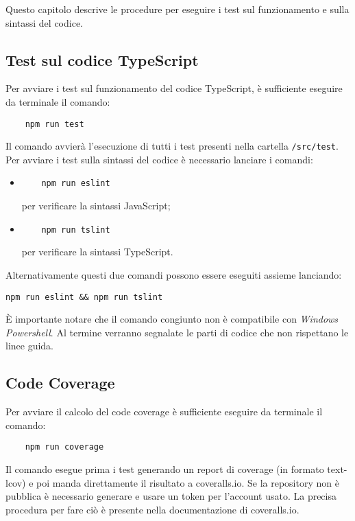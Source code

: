Questo capitolo descrive le procedure per eseguire i test sul funzionamento e sulla sintassi del codice.
\subsection{Test sul codice TypeScript}
Per avviare i test sul funzionamento del codice TypeScript, è sufficiente eseguire da terminale il comando:
\begin{verbatim}
	npm run test
\end{verbatim}
Il comando avvierà l'esecuzione di tutti i test presenti nella cartella \texttt{/src/test}.
Per avviare i test sulla sintassi del codice è necessario lanciare i comandi:
\begin{itemize}
	\item \begin{verbatim}
	npm run eslint
	\end{verbatim} per verificare la sintassi JavaScript;
	\item \begin{verbatim}
	npm run tslint
	\end{verbatim}
	per verificare la sintassi TypeScript.
\end{itemize}
Alternativamente questi due comandi possono essere eseguiti assieme lanciando:
\begin{verbatim}
npm run eslint && npm run tslint
\end{verbatim}
È importante notare che il comando congiunto non è compatibile con \emph{Windows Powershell}.
Al termine verranno segnalate le parti di codice che non rispettano le linee guida.

\subsection{Code Coverage}
Per avviare il calcolo del code coverage è sufficiente eseguire da terminale il comando:
\begin{verbatim}
	npm run coverage
\end{verbatim}
Il comando esegue prima i test generando un report di coverage (in formato text-lcov) e poi manda direttamente il risultato a coveralls.io.
Se la repository non è pubblica è necessario generare e usare un token per l'account usato. La precisa procedura per fare ciò è presente nella documentazione di coveralls.io.